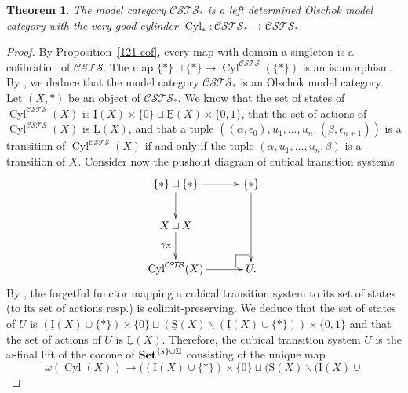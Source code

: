 \documentclass[a4paper,12pt]{amsart}
\newtheorem{thm}{Theorem}[section]
\begin{document}
\begin{thm} The model category ${\mathcal{C\!S\!T\!S}}_*$ is a left determined Olschok model
category with the very good cylinder $\operatorname{{Cyl}}_*:{\mathcal{C\!S\!T\!S}}_* \to
{\mathcal{C\!S\!T\!S}}_*$.  \end{thm}

\begin{proof} By Proposition~\ref{121-cof}, every map with domain a singleton
is a cofibration of ${\mathcal{C\!S\!T\!S}}$.  The map $\{*\} \sqcup \{*\} \to
\operatorname{{Cyl}}^{\mathcal{C\!S\!T\!S}}(\{*\})$ is an isomorphism. By \cite[Theorem~5.8]{leftdet},
we deduce that the model category ${\mathcal{C\!S\!T\!S}}_*$ is an Olschok model
category. Let $(X,*)$ be an object of ${\mathcal{C\!S\!T\!S}}_*$. We know that the set
of states of $\operatorname{{Cyl}}^{\mathcal{C\!S\!T\!S}}(X)$ is $\operatorname{\underline{I}}(X) \times\{0\} \sqcup \operatorname{\underline{E}}(X) \times
\{0,1\}$, that the set of actions of $\operatorname{{Cyl}}^{\mathcal{C\!S\!T\!S}}(X)$ is $\operatorname{\underline{L}}(X)$, and
that a tuple
$((\alpha,\epsilon_0),u_1,\dots,u_n,(\beta,\epsilon_{n+1}))$ is a
transition of $\operatorname{{Cyl}}^{\mathcal{C\!S\!T\!S}}(X)$ if and only if the tuple
$(\alpha,u_1,\dots,u_n,\beta)$ is a transition of $X$.  Consider now
the pushout diagram of cubical transition systems
\[
\xymatrix@C=3em {
  \{*\} \sqcup \{*\} {\ar@{->}[r]^-{{}}} {\ar@{->}[d]_-{{}}} & \{*\} {\ar@{->}[dd]_-{{}}} \\
  X \sqcup X {\ar@{->}[d]_-{{\gamma_X}}} & \\
  \operatorname{{Cyl}}^{\mathcal{C\!S\!T\!S}}(X) {\ar@{->}[r]^-{{}}} & {  \ar@{-}[]+L+<-6pt,+2pt>;[]+LU+<-6pt,+6pt>  \ar@{-}[]+U+<-2pt,+6pt>;[]+LU+<-6pt,+6pt>}
  U. }
\]
By \cite[Lemma~3.5]{biscsts1}, the forgetful functor mapping a cubical
transition system to its set of states (to its set of actions resp.)
is colimit-preserving. We deduce that the set of states of $U$ is
$(\operatorname{\underline{I}}(X) \cup \{*\}) \times\{0\} \sqcup (\operatorname{\underline{S}}(X)\backslash (\operatorname{\underline{I}}(X) \cup
\{*\})) \times \{0,1\}$ and that the set of actions of $U$ is
$\operatorname{\underline{L}}(X)$. Therefore, the cubical transition system $U$ is the
$\omega$-final lift of the cocone of ${{{\rm{\mathbf{{Set}}}}}}^{\{s\}\cup \Sigma}$
consisting of the unique map \[\omega(\operatorname{{Cyl}}(X)) \longrightarrow
((\operatorname{\underline{I}}(X) \cup \{*\})\times \{0\} \sqcup (\operatorname{\underline{S}}(X)\backslash (\operatorname{\underline{I}}(X) \cup
\]
\end{proof}
\end{document}
